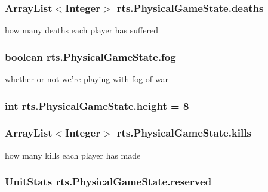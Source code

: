 \label{classrts_1_1_physical_game_state_aba5e892341302f7278d8b6133f194c90}
\hypertarget{classrts_1_1_physical_game_state_a0571840305c2f0fe37472f4c7cad53fd}{
\subsubsection[{deaths}]{\setlength{\rightskip}{0pt plus 5cm}ArrayList$<$Integer$>$ {\bf rts.PhysicalGameState.deaths}}}
\label{classrts_1_1_physical_game_state_a0571840305c2f0fe37472f4c7cad53fd}
how many deaths each player has suffered \hypertarget{classrts_1_1_physical_game_state_a65777e188928a93d3317197a70b8469e}{
\subsubsection[{fog}]{\setlength{\rightskip}{0pt plus 5cm}boolean {\bf rts.PhysicalGameState.fog}}}
\label{classrts_1_1_physical_game_state_a65777e188928a93d3317197a70b8469e}
whether or not we're playing with fog of war \hypertarget{classrts_1_1_physical_game_state_a5703d32962637e69a729bf812e66e4bd}{
\subsubsection[{height}]{\setlength{\rightskip}{0pt plus 5cm}int {\bf rts.PhysicalGameState.height} = 8}}
\label{classrts_1_1_physical_game_state_a5703d32962637e69a729bf812e66e4bd}
\hypertarget{classrts_1_1_physical_game_state_afa9214b286e0460666120fa20d8d17a1}{
\subsubsection[{kills}]{\setlength{\rightskip}{0pt plus 5cm}ArrayList$<$Integer$>$ {\bf rts.PhysicalGameState.kills}}}
\label{classrts_1_1_physical_game_state_afa9214b286e0460666120fa20d8d17a1}
how many kills each player has made \hypertarget{classrts_1_1_physical_game_state_aaf605aca11050ce864c61502afe8f023}{
\subsubsection[{reserved}]{\setlength{\rightskip}{0pt plus 5cm}UnitStats {\bf rts.PhysicalGameState.reserved}}}
